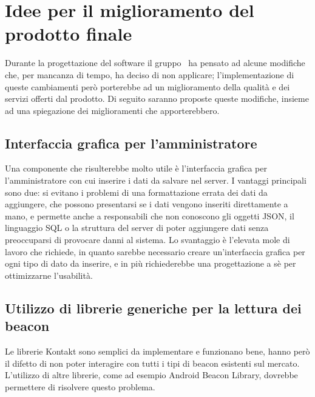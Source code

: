 \section{Idee per il miglioramento del prodotto finale}
\label{miglioramento}
Durante la progettazione del software il gruppo \AUTORE\ ha pensato ad alcune modifiche che, per mancanza di tempo, ha deciso di non applicare; l'implementazione di queste cambiamenti però porterebbe ad un miglioramento della qualità e dei servizi offerti dal prodotto. Di seguito saranno proposte queste modifiche, insieme ad una spiegazione dei miglioramenti che apporterebbero.
	\subsection{Interfaccia grafica per l'amministratore}
		Una componente che risulterebbe molto utile è l'interfaccia grafica per l'amministratore con cui inserire i dati da salvare nel server. I vantaggi principali sono due: si evitano i problemi di una formattazione errata dei dati da aggiungere, che possono presentarsi se i dati vengono inseriti direttamente a mano, e permette anche a responsabili che non conoscono gli oggetti JSON, il linguaggio SQL o la struttura del server di poter aggiungere dati senza preoccuparsi di provocare danni al sistema. Lo svantaggio è l'elevata mole di lavoro che richiede, in quanto sarebbe necessario creare un'interfaccia grafica per ogni tipo di dato da inserire, e in più richiederebbe una progettazione a sè per ottimizzarne l'usabilità.
	\label{libreria_beacon}
	\subsection{Utilizzo di librerie generiche per la lettura dei beacon}
		Le librerie Kontakt sono semplici da implementare e funzionano bene, hanno però il difetto di non poter interagire con tutti i tipi di beacon esistenti sul mercato. L'utilizzo di altre librerie, come ad esempio Android Beacon Library, dovrebbe permettere di risolvere questo problema.
	\label{gestione_errori}
